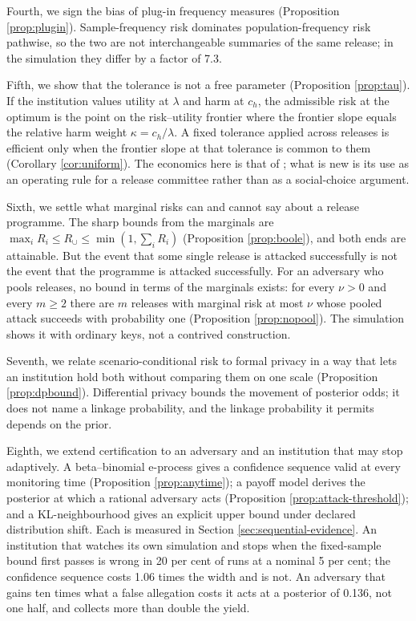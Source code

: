 \documentclass[11pt,a4paper]{article}
\theoremstyle{plain}
\theoremstyle{definition}
\begin{document}
Fourth, we sign the bias of plug-in frequency measures (Proposition
\ref{prop:plugin}). Sample-frequency risk dominates population-frequency risk
pathwise, so the two are not interchangeable summaries of the same release; in
the simulation they differ by a factor of 7.3.

Fifth, we show that the tolerance is not a free parameter (Proposition
\ref{prop:tau}). If the institution values utility at $\lambda$ and harm at
$c_h$, the admissible risk at the optimum is the point on the risk--utility
frontier where the frontier slope equals the relative harm weight $\kappa = c_h /
\lambda$. A fixed tolerance applied across releases is efficient only when the
frontier slope at that tolerance is common to them (Corollary
\ref{cor:uniform}). The economics here is that of
\citet{abowd2019}; what is new is its use as an operating rule for a release
committee rather than as a social-choice argument.

Sixth, we settle what marginal risks can and cannot say about a release
programme. The sharp bounds from the marginals are $\max_i R_i \leq R_\cup \leq
\min(1, \sum_i R_i)$ (Proposition \ref{prop:boole}), and both ends are
attainable. But the event that some single release is attacked successfully is
not the event that the programme is attacked successfully. For an adversary who
pools releases, no bound in terms of the marginals exists: for every
$\nu > 0$ and every $m \geq 2$ there are $m$ releases with marginal risk at most
$\nu$ whose pooled attack succeeds with probability one
(Proposition \ref{prop:nopool}). The simulation shows it with ordinary
keys, not a contrived construction.

Seventh, we relate scenario-conditional risk to formal privacy in a way that
lets an institution hold both without comparing them on one scale (Proposition
\ref{prop:dpbound}). Differential privacy bounds the movement of
posterior odds; it does not name a linkage probability, and the linkage
probability it permits depends on the prior.

Eighth, we extend certification to an adversary and an institution that may stop
adaptively. A beta--binomial e-process gives a confidence sequence valid at every
monitoring time (Proposition \ref{prop:anytime}); a payoff model derives the
posterior at which a rational adversary acts (Proposition
\ref{prop:attack-threshold}); and a KL-neighbourhood gives an explicit upper
bound under declared distribution shift. Each is measured in Section
\ref{sec:sequential-evidence}. An institution that watches its own simulation and
stops when the fixed-sample bound first passes is wrong in 20 per
cent of runs at a nominal 5 per cent; the confidence sequence costs
1.06 times the width and is not. An adversary that gains ten times
what a false allegation costs it acts at a posterior of 0.136,
not one half, and collects more than double the yield.
\end{document}

